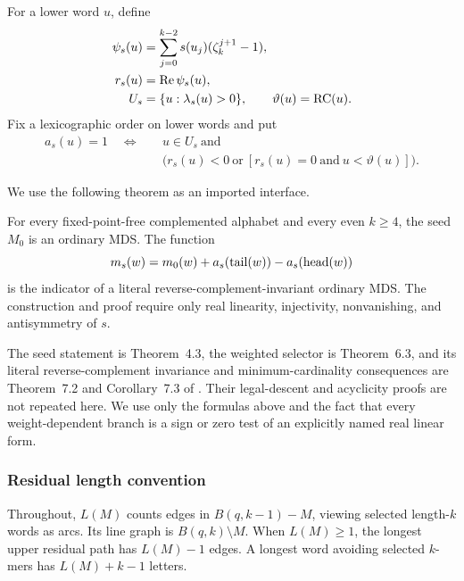 For a lower word $u$, define
\begin{align}
  \psi_s(u)&=\sum_{j=0}^{k-2}s(u_j)(\zeta_k^{j+1}-1),                     \label{eq:psi}\\
  r_s(u)&=\operatorname{Re}\psi_s(u),                                    \label{eq:midpoint}\\
  U_s&=\{u:\lambda_s(u)>0\},\qquad \vartheta(u)=\operatorname{RC}(u).                  \label{eq:positive-support}
\end{align}
Fix a lexicographic order on lower words and put
\begin{equation}
  \begin{aligned}
  a_s(u)=1\quad\Longleftrightarrow\quad&
  u\in U_s\ \text{and}\\
  &\bigl(r_s(u)<0\ \text{or}\ [r_s(u)=0\ \text{and}\ u<\vartheta(u)]\bigr).
  \end{aligned}
  \label{eq:as}
\end{equation}

We use the following theorem as an imported interface.

\begin{theorem}
\label{thm:imported-selector}
For every fixed-point-free complemented alphabet and every even $k\ge4$,
the seed $M_0$ is an ordinary MDS.  The function
\begin{equation}
  m_s(w)=m_0(w)+a_s(\operatorname{tail}(w))-a_s(\operatorname{head}(w))                               \label{eq:terminal-selector}
\end{equation}
is the indicator of a literal reverse-complement-invariant ordinary MDS.
The construction and proof require only real linearity, injectivity,
nonvanishing, and antisymmetry of $s$.
\end{theorem}

The seed statement is Theorem~4.3, the weighted selector is Theorem~6.3,
and its literal reverse-complement invariance and minimum-cardinality
consequences are Theorem~7.2 and Corollary~7.3 of
\cite{Babanskyy2026Parity}.  Their legal-descent and acyclicity proofs are not
repeated here.  We use only the formulas above and the fact that every
weight-dependent branch is a sign or zero test of an explicitly named real
linear form.

\subsubsection{Residual length convention}
Throughout, $L(M)$ counts edges in $B(q,k-1)-M$, viewing selected
length-$k$ words as arcs. Its line graph is $B(q,k)\setminus M$.
When $L(M)\ge1$, the longest upper residual path has $L(M)-1$ edges.
A longest word avoiding selected $k$-mers has $L(M)+k-1$ letters.

